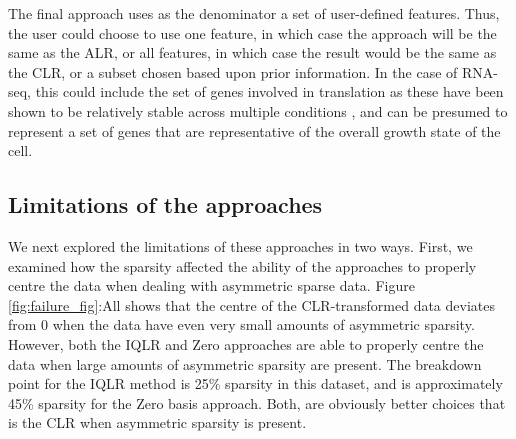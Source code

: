 \documentclass [10pt]{article}
\begin{document}
The  final approach uses as the denominator a set of user-defined features. Thus, the user could choose to use one feature, in which case the approach will be the same as the ALR, or all features, in which case the result would be the same as the CLR, or a subset chosen based upon prior information. In the case of RNA-seq, this could include the set of genes involved in translation as these have been shown to be relatively stable across multiple conditions , and can be presumed to represent a set of genes that are representative of the overall growth state of the cell.

\subsection{Limitations of the approaches}
\vskip-0.25cm
We next explored the limitations of these approaches in two ways. First, we examined how the sparsity affected the ability of the approaches to properly centre the data when dealing with asymmetric sparse data. Figure \ref{fig:failure_fig}:All shows that the centre of the CLR-transformed data deviates from 0 when the data have even very small amounts of asymmetric sparsity. However, both the IQLR and Zero approaches are able to properly centre the data when large amounts of asymmetric sparsity are present. The breakdown point for the IQLR method is 25\% sparsity in this dataset, and is approximately  45\% sparsity for the Zero basis approach. Both, are obviously better choices that is the CLR when asymmetric sparsity is present. 
\end{document}
